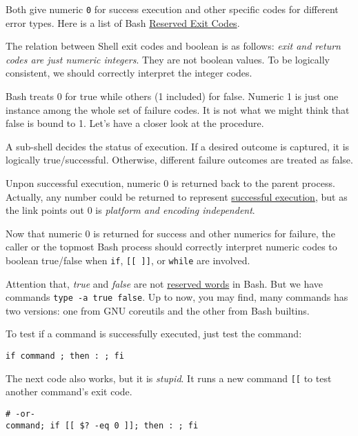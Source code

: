 Both give numeric \verb|0| for success execution and other
specific codes for different error types. Here is a list of Bash
\href{http://tldp.org/LDP/abs/html/exitcodes.html#EXITCODESREF}{Reserved
  Exit Codes}.

The relation between Shell exit codes and boolean is as follows:
\textit{exit and return codes are just numeric integers}. They are
not boolean values. To be logically consistent, we should
correctly interpret the integer codes.

Bash treats 0 for true while others (1 included) for
false. Numeric 1 is just one instance among the whole set of
failure codes. It is not what we might think that false is bound
to 1. Let's have a closer look at the procedure.

A sub-shell decides the status of execution. If a desired
outcome is captured, it is logically true/successful. Otherwise,
different failure outcomes are treated as false.

Unpon successful execution, numeric 0 is returned back to the
parent process. Actually, any number could be returned to
represent
\href{https://stackoverflow.com/a/21439109/2336707}{successful
  execution}, but as the link points out 0 is \textit{platform and
  encoding independent}.

Now that numeric 0 is returned for success and other numerics for
failure, the caller or the topmost Bash process should correctly
interpret numeric codes to boolean true/false when \lstinline|if|,
\lstinline|[[ ]]|, or \lstinline|while| are involved.

Attention that, \textit{true} and \textit{false} are not
\href{https://www.gnu.org/software/bash/manual/html_node/Reserved-Word-Index.html}{reserved
  words} in Bash. But we have commands
\lstinline|type -a true false|. Up to now, you may find, many
commands has two versions: one from GNU coreutils and the other
from Bash builtins.

To test if a command is successfully executed, just test the command:

\begin{lstlisting}
if command ; then : ; fi
\end{lstlisting}

The next code also works, but it is \textit{stupid}. It runs a new
command \lstinline|[[| to test another command's exit code.

\begin{lstlisting}
# -or-
command; if [[ $? -eq 0 ]]; then : ; fi
\end{lstlisting}

